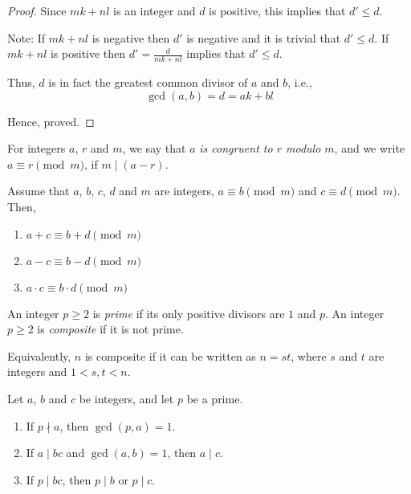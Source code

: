 \begin{proof}
	Since $mk + nl$ is an integer and $d$ is positive, this implies that $d' \leq d$.

	Note: If $mk+nl$ is negative then $d'$ is negative and it is trivial that $d' \leq d$. If $mk+nl$ is positive then $d' = \frac{d}{mk+nl}$ implies that $d' \leq d$.

	Thus, $d$ is in fact the greatest common divisor of $a$ and $b$, i.e., $$\gcd(a, b) = d = ak + bl$$

	Hence, proved.
\end{proof}

\begin{definition} \label{mod}
	For integers $a$, $r$ and $m$, we say that $a$ \emph{is congruent to $r$ modulo $m$}, and we write $a \equiv r \pmod m$, if $m \mid (a-r)$.
\end{definition}

\begin{proposition} \label{modprop}
	Assume that $a$, $b$, $c$, $d$ and $m$ are integers, $a \equiv b \pmod m$ and $c \equiv d \pmod m$. Then,

	\begin{enumerate}
		\item $a + c \equiv b + d \pmod m$
		\item $a - c \equiv b - d \pmod m$
		\item $a \cdot c \equiv b \cdot d \pmod m$
	\end{enumerate}
\end{proposition}

\begin{definition} \label{prime}
	An integer $p \geq 2$ is \emph{prime} if its only positive divisors are $1$ and $p$. An integer $p \geq 2$ is \emph{composite} if it is not prime.

	Equivalently, $n$ is composite if it can be written as $n = st$, where $s$ and $t$ are integers and $1 < s,t < n$.
\end{definition}

\begin{lemma} \label{modprime}
	Let $a$, $b$ and $c$ be integers, and let $p$ be a prime.
	\begin{enumerate}
		\item If $p \nmid a$, then $\gcd(p, a) = 1$.
		\item If $a \mid bc$ and $\gcd(a, b) = 1$, then $a \mid c$.
		\item If $p \mid bc$, then $p \mid b$ or $p \mid c$.
	\end{enumerate}
\end{lemma}

